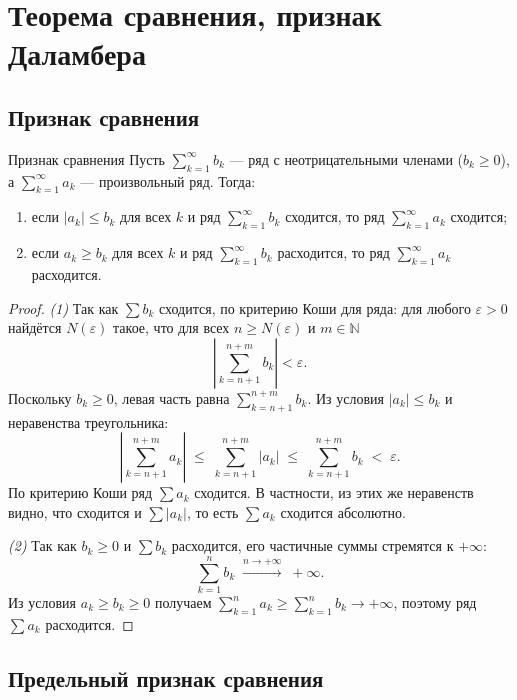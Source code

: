 
\section{Теорема сравнения, признак Даламбера}

\subsection*{Признак сравнения}

\begin{Theorem}{Признак сравнения}{}
	Пусть $\sum_{k=1}^{\infty} b_k$ --- ряд с неотрицательными членами ($b_k \ge 0$),
	а $\sum_{k=1}^{\infty} a_k$ --- произвольный ряд. Тогда:
	\begin{enumerate}
		\item если $|a_k| \le b_k$ для всех $k$ и ряд $\sum_{k=1}^{\infty} b_k$ сходится,
		то ряд $\sum_{k=1}^{\infty} a_k$ сходится;
		\item если $a_k \ge b_k$ для всех $k$ и ряд $\sum_{k=1}^{\infty} b_k$ расходится,
		то ряд $\sum_{k=1}^{\infty} a_k$ расходится.
	\end{enumerate}
\end{Theorem}

\begin{proof}
	\emph{(1)} Так как $\sum b_k$ сходится, по критерию Коши для ряда:
	для любого $\varepsilon > 0$ найдётся $N(\varepsilon)$ такое, что для всех
	$n \ge N(\varepsilon)$ и $m \in \mathbb{N}$
	\[
	\left|\sum_{k=n+1}^{n+m} b_k\right| < \varepsilon.
	\]
	Поскольку $b_k \ge 0$, левая часть равна $\sum_{k=n+1}^{n+m} b_k$.
	Из условия $|a_k| \le b_k$ и неравенства треугольника:
	\[
	\left|\sum_{k=n+1}^{n+m} a_k\right|
	\;\le\; \sum_{k=n+1}^{n+m} |a_k|
	\;\le\; \sum_{k=n+1}^{n+m} b_k
	\;<\; \varepsilon.
	\]
	По критерию Коши ряд $\sum a_k$ сходится. В частности, из этих же неравенств
	видно, что сходится и $\sum |a_k|$, то есть $\sum a_k$ сходится абсолютно.
	
	\emph{(2)} Так как $b_k \ge 0$ и $\sum b_k$ расходится, его частичные суммы
	стремятся к $+\infty$:
	\[
	\sum_{k=1}^{n} b_k \;\xrightarrow{n \to +\infty}\; +\infty.
	\]
	Из условия $a_k \ge b_k \ge 0$ получаем
	$\sum_{k=1}^{n} a_k \ge \sum_{k=1}^{n} b_k \to +\infty$,
	поэтому ряд $\sum a_k$ расходится.
\end{proof}

\subsection*{Предельный признак сравнения}


